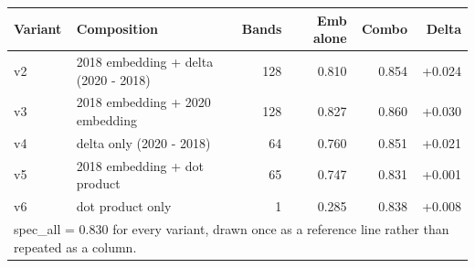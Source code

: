 \begin{tabular}{llrrrr}
\toprule
Variant & Composition & Bands & Emb alone & Combo & Delta \\
\midrule
v2 & 2018 embedding + delta (2020 - 2018) & 128 & 0.810 & 0.854 & +0.024 \\
v3 & 2018 embedding + 2020 embedding & 128 & 0.827 & 0.860 & +0.030 \\
v4 & delta only (2020 - 2018) & 64 & 0.760 & 0.851 & +0.021 \\
v5 & 2018 embedding + dot product & 65 & 0.747 & 0.831 & +0.001 \\
v6 & dot product only & 1 & 0.285 & 0.838 & +0.008 \\
\bottomrule
\multicolumn{6}{l}{\footnotesize spec\_all = 0.830 for every variant, drawn once as a reference line rather than repeated as a column.} \\
\end{tabular}
